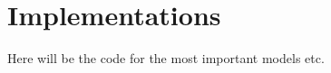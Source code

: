 \chapter{Implementations}
\label{chap:app.implementations}

Here will be the code for the most important models etc.

